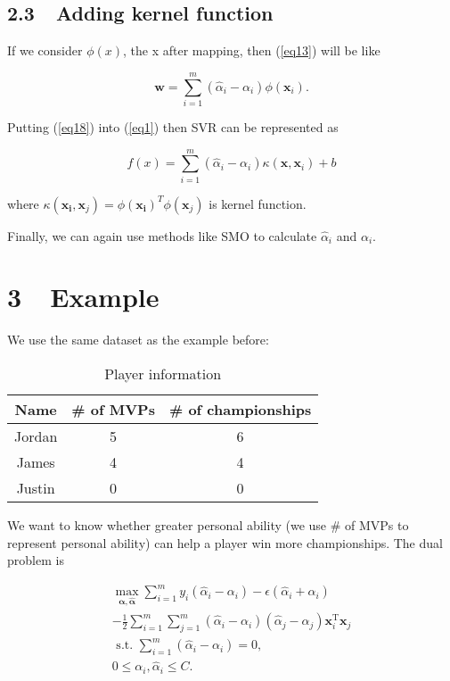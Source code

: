 \documentclass{article}
\begin{document}
\subsection*{2.3 $    $ $  $ Adding kernel function}

If we consider $\phi(x)$, the x after mapping, then (\ref{eq13}) will be like

\begin{equation} \label{eq18}
\boldsymbol{w}=\sum_{i=1}^m\left(\hat{\alpha}_i-\alpha_i\right) \phi\left(\boldsymbol{x}_i\right) .
\end{equation}

Putting (\ref{eq18}) into (\ref{eq1}) then SVR can be represented as 

\begin{equation}
f(x)=\sum_{i=1}^m\left(\hat{\alpha}_i-\alpha_i\right) \kappa(\boldsymbol{x}, \boldsymbol{x}_i)+b
\end{equation}

where $\kappa(\boldsymbol{x_i}, \boldsymbol{x}_j) = \phi(\boldsymbol{x_i})^T\phi(\boldsymbol{x}_j)$ is kernel function.

Finally, we can again use methods like SMO to calculate $\hat{\alpha}_i$ and $\alpha_i$.

\section*{3 $    $ $  $ Example}

We use the same dataset as the example before:

\begin{table}[H]
\centering
\caption{Player information}
\begin{tabular}{ccc}
\hline
\textbf{Name} & \textbf{\# of MVPs} & \textbf{\# of championships} \\ \hline
Jordan & 5 &  6 \\
James & 4  & 4  \\
Justin & 0 & 0 \\ \hline
\end{tabular}
\end{table}

We want to know whether greater personal ability (we use # of MVPs to represent personal ability) can help a player win more championships. The dual problem is

\begin{gather*}
\max _{\boldsymbol{\alpha}, \boldsymbol{\hat{\alpha}}} \sum_{i=1}^m y_i\left(\hat{\alpha}_i-\alpha_i\right)-\epsilon\left(\hat{\alpha}_i+\alpha_i\right) \\
-\frac{1}{2} \sum_{i=1}^m \sum_{j=1}^m\left(\hat{\alpha}_i-\alpha_i\right)\left(\hat{\alpha}_j-\alpha_j\right) \boldsymbol{x}_i^{\mathrm{T}} \boldsymbol{x}_j \\
\text { s.t. } \sum_{i=1}^m\left(\hat{\alpha}_i-\alpha_i\right)=0, \\
0 \leq \alpha_i, \hat{\alpha}_i \leq C .
\end{gather*}
\end{document}
